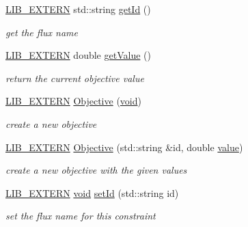 \begin{DoxyCompactItemize}
\item 
\hyperlink{libutil_8h_a48cc004c21e097c0d7c1c5fa8dc03b96}{L\+I\+B\+\_\+\+E\+X\+T\+E\+RN} std\+::string \hyperlink{class_l_i_b___s_t_r_u_c_t_u_r_a_l_1_1_objective_a1003bb99af516f1308ed6a0acffcecb9}{get\+Id} ()
\begin{DoxyCompactList}\small\item\em get the flux name \end{DoxyCompactList}\item 
\hyperlink{libutil_8h_a48cc004c21e097c0d7c1c5fa8dc03b96}{L\+I\+B\+\_\+\+E\+X\+T\+E\+RN} double \hyperlink{class_l_i_b___s_t_r_u_c_t_u_r_a_l_1_1_objective_afc8ed4b806e717897bd49c41458c9c46}{get\+Value} ()
\begin{DoxyCompactList}\small\item\em return the current objective value \end{DoxyCompactList}\item 
\hyperlink{libutil_8h_a48cc004c21e097c0d7c1c5fa8dc03b96}{L\+I\+B\+\_\+\+E\+X\+T\+E\+RN} \hyperlink{class_l_i_b___s_t_r_u_c_t_u_r_a_l_1_1_objective_a6b731a65cbefc80f0cde3763126a5284}{Objective} (\hyperlink{lp__lib_8h_ac7828c7b2b31d2e11af17bdb6289c5d9}{void})
\begin{DoxyCompactList}\small\item\em create a new objective \end{DoxyCompactList}\item 
\hyperlink{libutil_8h_a48cc004c21e097c0d7c1c5fa8dc03b96}{L\+I\+B\+\_\+\+E\+X\+T\+E\+RN} \hyperlink{class_l_i_b___s_t_r_u_c_t_u_r_a_l_1_1_objective_aecdd9a42869c81bf897039bfa6bee991}{Objective} (std\+::string \&id, double \hyperlink{lp__lib_8h_a606ba870f46e132d61b5e2371014a998}{value})
\begin{DoxyCompactList}\small\item\em create a new objective with the given values \end{DoxyCompactList}\item 
\hyperlink{libutil_8h_a48cc004c21e097c0d7c1c5fa8dc03b96}{L\+I\+B\+\_\+\+E\+X\+T\+E\+RN} \hyperlink{lp__lib_8h_ac7828c7b2b31d2e11af17bdb6289c5d9}{void} \hyperlink{class_l_i_b___s_t_r_u_c_t_u_r_a_l_1_1_objective_ae2224c32f5c6bd1150c5cbdfe2190679}{set\+Id} (std\+::string id)
\begin{DoxyCompactList}\small\item\em set the flux name for this constraint \end{DoxyCompactList}\item 

\end{DoxyCompactItemize}
